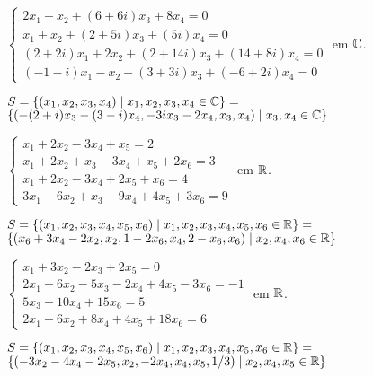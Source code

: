 \documentclass[12pt]{exam}
\begin{document}
\begin{exercicio}
  $
    \begin{cases}
      2x_1 + x_2 + (6 + 6i)x_3 + 8x_4 = 0\\
      x_1 + x_2 + (2 + 5i)x_3 + (5  i)x_4 = 0\\
      (2 + 2i)x_1 + 2x_2 + (2 + 14i)x_3 + (14 + 8i)x_4 =0\\
      (-1 - i)x_1 - x_2 - (3 + 3i)x_3 + (-6 + 2i)x_4 = 0
    \end{cases}
  $
  em $\mathbb{C}$.
  \begin{solucao}
    $S = \{(x_1, x_2, x_3, x_4) \mid x_1, x_2, x_3, x_4 \in \mathbb{C}\} = $\\ $\{(-(2 + i)x_3 - (3 - i)x_4,-3ix_3 - 2x_4, x_3, x_4) \mid x_3, x_4 \in \mathbb{C}\}$
  \end{solucao}
\end{exercicio}

\begin{exercicio}
  $
    \begin{cases}
      x_1 + 2x_2 - 3x_4 + x_5 = 2\\
      x_1 + 2x_2 + x_3 - 3x_4 + x_5 + 2x_6 = 3\\
      x_1 + 2x_2 - 3x_4 + 2x_5 + x_6 = 4\\
      3x_1 + 6x_2 + x_3 - 9x_4 + 4x_5 + 3x_6 = 9
    \end{cases}
  $
  em $\mathbb{R}$.
  \begin{solucao}
    $S = \{(x_1, x_2, x_3, x_4, x_5, x_6) \mid x_1, x_2, x_3, x_4, x_5, x_6 \in \mathbb{R}\} = $\\ $\{(x_6 + 3x_4 - 2x_2, x_2, 1 - 2x_6, x_4, 2 - x_6, x_6) \mid x_2, x_4, x_6 \in \mathbb{R}\}$
  \end{solucao}
\end{exercicio}

\begin{exercicio}
  $
    \begin{cases}
      x_1 + 3x_2 - 2x_3 + 2x_5 = 0\\
      2x_1 + 6x_2 - 5x_3 - 2x_4 + 4x_5 - 3x_6 = -1\\
      5x_3 + 10x_4 + 15x_6 = 5\\
      2x_1 + 6x_2 + 8x_4 + 4x_5 + 18x_6 = 6
    \end{cases}
  $
  em $\mathbb{R}$.
  \begin{solucao}
    $S = \{(x_1, x_2, x_3, x_4, x_5, x_6) \mid x_1, x_2, x_3, x_4, x_5, x_6 \in \mathbb{R}\} = $\\ $\{(-3x_2 - 4x_4 - 2x_5, x_2, -2x_4, x_4, x_5, 1/3) \mid x_2, x_4, x_5 \in \mathbb{R}\}$
  \end{solucao}
\end{exercicio}
\end{document}
